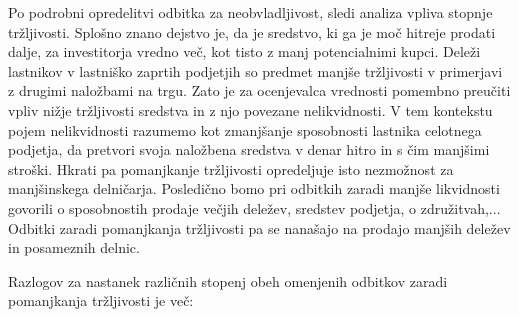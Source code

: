 \documentclass[12pt,a4paper]{amsart}
\theoremstyle{definition} %
\theoremstyle{plain} %
\begin{document}
Po podrobni opredelitvi odbitka za neobvladljivost, sledi analiza vpliva stopnje tržljivosti. Splošno znano dejstvo je, da je sredstvo, ki ga je moč hitreje prodati dalje, za investitorja vredno več, kot tisto z manj potencialnimi kupci. Deleži lastnikov v lastniško zaprtih podjetjih so predmet manjše tržljivosti v primerjavi z drugimi naložbami na trgu. Zato je za ocenjevalca vrednosti pomembno preučiti vpliv nižje tržljivosti sredstva in z njo povezane nelikvidnosti. V tem kontekstu pojem nelikvidnosti razumemo kot zmanjšanje sposobnosti lastnika celotnega podjetja, da pretvori svoja naložbena sredstva v denar hitro in s čim manjšimi stroški. Hkrati pa pomanjkanje tržljivosti opredeljuje isto nezmožnost za manjšinskega delničarja. Posledično bomo pri odbitkih zaradi manjše likvidnosti govorili o sposobnostih prodaje večjih deležev, sredstev podjetja, o združitvah,... Odbitki zaradi pomanjkanja tržljivosti pa se nanašajo na prodajo manjših deležev in posameznih delnic. \par
Razlogov za nastanek različnih stopenj obeh omenjenih odbitkov zaradi pomanjkanja tržljivosti je več:
\end{document}
